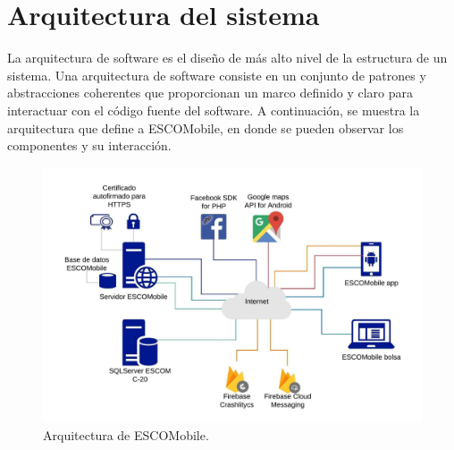 \section{Arquitectura del sistema}

\noindent
La arquitectura de software es el diseño de más alto nivel de la estructura de un sistema. Una arquitectura de software consiste en un conjunto de patrones y abstracciones coherentes que proporcionan un marco definido y claro para interactuar con el código fuente del software.
\newline 
A continuación, se muestra la arquitectura que define a ESCOMobile, en donde se pueden observar los componentes y su interacción.

\pagebreak
\begin{figure}[!htpb]
	\hypertarget{fig:Arqui}{\hspace{1pt}}
	\begin{center}
		\includegraphics[width=1\textwidth]{images/clases/arquitectura}
		\caption{Arquitectura de ESCOMobile.}
		\label{fig:Arqui}
	\end{center}
\end{figure}